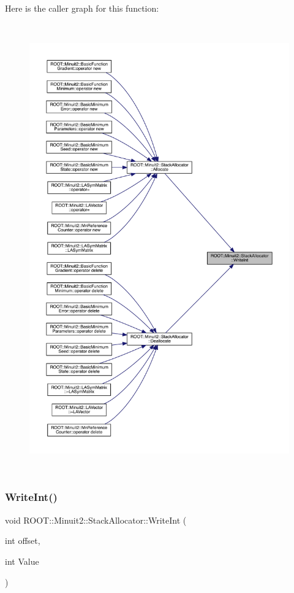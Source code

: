 Here is the caller graph for this function\+:\nopagebreak
\begin{figure}[H]
\begin{center}
\leavevmode
\includegraphics[height=550pt]{d3/d1e/classROOT_1_1Minuit2_1_1StackAllocator_a1f87ef34658b74aa3fff9abd1cd1094e_icgraph}
\end{center}
\end{figure}
\mbox{\label{classROOT_1_1Minuit2_1_1StackAllocator_a1f87ef34658b74aa3fff9abd1cd1094e}} 
\subsubsection{\texorpdfstring{WriteInt()}{WriteInt()}\hspace{0.1cm}{\footnotesize\ttfamily [2/2]}}
{\footnotesize\ttfamily void R\+O\+O\+T\+::\+Minuit2\+::\+Stack\+Allocator\+::\+Write\+Int (\begin{DoxyParamCaption}\item[{int}]{offset,  }\item[{int}]{Value }\end{DoxyParamCaption})\hspace{0.3cm}{\ttfamily [inline]}}



